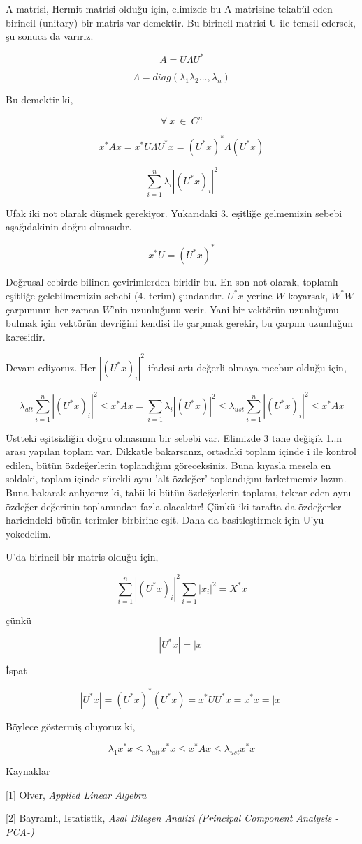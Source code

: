 \documentclass[12pt,fleqn]{article}\usepackage{../../common}
\begin{document}
A matrisi, Hermit matrisi olduğu için, elimizde bu A matrisine tekabül eden
birincil (unitary) bir matris var demektir. Bu birincil matrisi U ile
temsil edersek, şu sonuca da varırız.

$$ A = U \Lambda U^* $$

$$ \Lambda = diag(\lambda_1\lambda_2...,\lambda_n) $$

Bu demektir ki, 

$$ \forall \ x \ \in \ C^n  $$

$$ x^*Ax = x^*U\Lambda U^*x = (U^*x)^*\Lambda(U^*x) $$

$$ \sum_{i=1}^n \lambda_i |(U^*x)_i|^2 $$

Ufak iki not olarak düşmek gerekiyor. Yukarıdaki 3. eşitliğe gelmemizin
sebebi aşağıdakinin doğru olmasıdır.

$$ x^*U = (U^*x)^* $$

Doğrusal cebirde bilinen çevirimlerden biridir bu. En son not olarak,
toplamlı eşitliğe gelebilmemizin sebebi (4. terim) şundandır. $U^*x$ yerine
$W$ koyarsak, $W^*W$ çarpımının her zaman $W$'nin uzunluğunu verir. Yani
bir vektörün uzunluğunu bulmak için vektörün devriğini kendisi ile çarpmak
gerekir, bu çarpım uzunluğun karesidir.

Devam ediyoruz. Her $|(U^*x)_i|^2$ ifadesi artı değerli olmaya mecbur
olduğu için,

$$ \lambda_{alt}\sum_{i=1}^n |(U^*x)_i|^2 \le x^*Ax = 
\sum_{i=1}\lambda_i |(U^*x)|^2 \le
\lambda_{ust}\sum_{i=1}^n |(U^*x)_i|^2 \le x^*Ax 
 $$

Üstteki eşitsizliğin doğru olmasının bir sebebi var. Elimizde 3 tane
değişik 1..n arası yapılan toplam var. Dikkatle bakarsanız, ortadaki
toplam içinde i ile kontrol edilen, bütün özdeğerlerin toplandığını
göreceksiniz. Buna kıyasla mesela en soldaki, toplam içinde sürekli aynı
'alt özdeğer' toplandığını farketmemiz lazım. Buna bakarak anlıyoruz ki,
tabii ki bütün özdeğerlerin toplamı, tekrar eden aynı özdeğer değerinin
toplamından fazla olacaktır! Çünkü iki tarafta da özdeğerler haricindeki
bütün terimler birbirine eşit. Daha da basitleştirmek için U'yu yokedelim.

U'da birincil bir matris olduğu için, 

$$ \sum_{i=1}^n |(U^*x)_i|^2 \sum_{i=1} |x_i|^2 = X^*x  $$

çünkü

$$ |U^*x| = |x|$$

İspat

$$ |U^*x| = (U^*x)^*(U^*x) = x^*UU^*x = x^*x = |x| $$

Böylece göstermiş oluyoruz ki, 

$$ \lambda_1x^*x \le \lambda_{alt}x^*x \le x^*Ax \le \lambda_{ust}x^*x $$ 

Kaynaklar

[1] Olver, {\em Applied Linear Algebra}

[2] Bayramlı, Istatistik, {\em Asal Bileşen Analizi (Principal Component Analysis -PCA-)}
\end{document}
